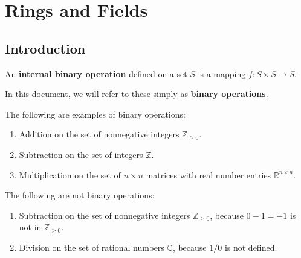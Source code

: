 \documentclass{scrartcl}
\begin{document}
\section{Rings and Fields}

\subsection{Introduction}

\begin{definition}
    \label{def:binary operation}

    \newcommand{\Q}{\mathbb{Q}}
    \newcommand{\R}{\mathbb{R}}
    \newcommand{\Z}{\mathbb{Z}}

    An \textbf{internal binary operation} defined on a set $S$ is a mapping $f:S\times S\to S$.

    In this document, we will refer to these simply as \textbf{binary operations}.

    The following are examples of binary operations:
    \begin{enumerate}
        \item Addition on the set of nonnegative integers $\Z_{\geq 0}$.
        \item Subtraction on the set of integers $\Z$.
        \item Multiplication on the set of $n\times n$ matrices with real number entries $\R^{n\times n}$.
    \end{enumerate}

    The following are not binary operations:
    \begin{enumerate}
        \item Subtraction on the set of nonnegative integers $\Z_{\geq 0}$, because $0-1=-1$ is not in $\Z_{\geq 0}$.
        \item Division on the set of rational numbers $\Q$, because $1/0$ is not defined.
    \end{enumerate}
\end{definition}
\end{document}
